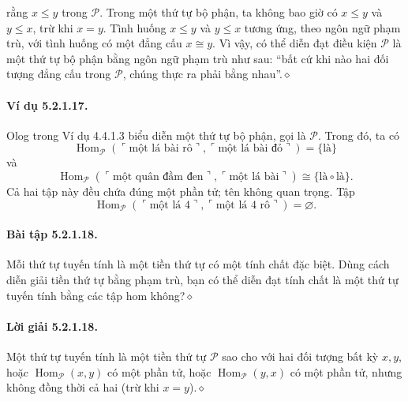 rằng $x\leq y$ trong $\mathcal P$. Trong một thứ tự bộ phận, ta không bao giờ có $x\leq y$ và $y\leq x$, trừ khi $x=y$. Tình huống $x\leq y$ và $y\leq x$ tương ứng, theo ngôn ngữ phạm trù, với tình huống có một đẳng cấu $x\cong y$. Vì vậy, có thể diễn đạt điều kiện $\mathcal P$ là một thứ tự bộ phận bằng ngôn ngữ phạm trù như sau: ``bất cứ khi nào hai đối tượng đẳng cấu trong $\mathcal P$, chúng thực ra phải bằng nhau''.\hfill$\diamond$
\paragraph{Ví dụ 5.2.1.17.} Olog trong Ví dụ 4.4.1.3 biểu diễn một thứ tự bộ phận, gọi là $\mathcal P$. Trong đó, ta có
\[\operatorname{Hom}_{\mathcal P}(\ulcorner\text{một lá bài rô}\urcorner,\ulcorner\text{một lá bài đỏ}\urcorner)=\{\text{là}\}\]
và
\[\operatorname{Hom}_{\mathcal P}(\ulcorner\text{một quân đầm đen}\urcorner,\ulcorner\text{một lá bài}\urcorner)\cong\{\text{là}\circ\text{là}\}.\]
Cả hai tập này đều chứa đúng một phần tử; tên không quan trọng. Tập
\[\operatorname{Hom}_{\mathcal P}(\ulcorner\text{một lá 4}\urcorner,\ulcorner\text{một lá 4 rô}\urcorner)=\varnothing.\]
\paragraph{Bài tập 5.2.1.18.} Mỗi thứ tự tuyến tính là một tiền thứ tự có một tính chất đặc biệt. Dùng cách diễn giải tiền thứ tự bằng phạm trù, bạn có thể diễn đạt tính chất là một thứ tự tuyến tính bằng các tập hom không?\hfill$\diamond$
\paragraph{Lời giải 5.2.1.18.} Một thứ tự tuyến tính là một tiền thứ tự $\mathcal P$ sao cho với hai đối tượng bất kỳ $x,y$, hoặc $\operatorname{Hom}_{\mathcal P}(x,y)$ có một phần tử, hoặc $\operatorname{Hom}_{\mathcal P}(y,x)$ có một phần tử, nhưng không đồng thời cả hai (trừ khi $x=y$).\hfill$\diamond$
